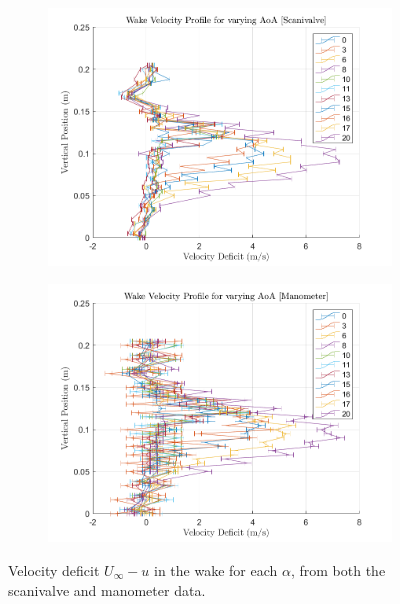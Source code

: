 \documentclass[runningheads]{llncs}
\begin{document}
\begin{figure}
    \centering
    \begin{subfigure}[b]{0.45\textwidth}
         \centering
         \includegraphics[width=\textwidth]{figures/scanivalve_wake_velocities.png}
          \caption{}
         \label{fig:scanivalve_wake_velocity}
     \end{subfigure}
     \begin{subfigure}[b]{0.45\textwidth}
         \centering
         \includegraphics[width=\textwidth]{figures/manometer_wake_velocities.png}
         \caption{}
         \label{fig:manometer_wake_velocity}
     \end{subfigure}
    \caption{Velocity deficit $U_\infty - u$ in the wake for each $\alpha$, from both the scanivalve and manometer data.}
    \label{fig:wake_velocities}
\end{figure}
\end{document}

